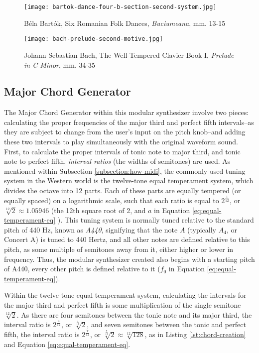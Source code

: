 \begin{figure}[h]
  \centering
  \texttt{[image: bartok-dance-four-b-section-second-system.jpg]}
  \caption{Béla Bartók, Six Romanian Folk Dances, \textit{Buciumeana},  mm. 13-15}
  \label{fig:legato-notes-example}
\end{figure}

\begin{figure}[h]
  \centering
  \texttt{[image: bach-prelude-second-motive.jpg]}
  \caption{Johann Sebastian Bach, The Well-Tempered Clavier Book I, \textit{Prelude in C Minor}, mm. 34-35}
  \label{fig:tied-notes-example}
\end{figure}

\subsection{Major Chord Generator}

The Major Chord Generator within this modular synthesizer involve two pieces: calculating the proper frequencies of the major third and perfect fifth intervals--as they are subject to change from the user's input on the pitch knob--and adding these two intervals to play simultaneously with the original waveform sound. First, to calculate the proper intervals of tonic note to major third, and tonic note to perfect fifth, \textit{interval ratios} (the widths of semitones) are used. As mentioned within Subsection \ref{subsection:how-midi}, the commonly used tuning system in the Western world is the twelve-tone equal temperament system, which divides the octave into 12 parts. Each of these parts are equally tempered (or equally spaced) on a logarithmic scale, such that each ratio is equal to $2^\frac{1}{12}$, or $\sqrt[12]{2} \approx 1.05946$ (the 12th square root of 2, and $a$ in Equation \ref{eq:equal-temperament-eq} \cite{Suits_1998}). This tuning system is normally tuned relative to the standard pitch of 440 Hz, known as \textit{A440}, signifying that the note $A$ (typically $A_4$, or Concert A) is tuned to 440 Hertz, and all other notes are defined relative to this pitch, as some multiple of semitones away from it, either higher or lower in frequency. Thus,  the modular synthesizer created also begins with a starting pitch of A440, every other pitch is defined relative to it ($f_0$ in Equation \ref{eq:equal-temperament-eq}).

Within the twelve-tone equal temperament system, calculating the intervals for the major third and perfect fifth is some multiplication of the single semitone $\sqrt[12]{2}$. As there are four semitones between the tonic note and its major third, the interval ratio is $2^\frac{4}{12}$, or $\sqrt[\frac{4}{12}]{2}$, and seven semitones between the tonic and perfect fifth, the interval ratio is $2^\frac{7}{12}$, or $\sqrt[\frac{7}{12}]{2} \approx \sqrt[12]{128}$, as in Listing \ref{lst:chord-creation} and Equation \ref{eq:equal-temperament-eq}. 

